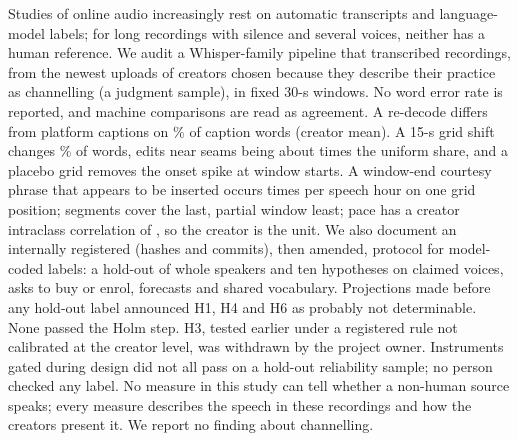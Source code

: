 
Studies of online audio increasingly rest on automatic transcripts and language-model labels; for long recordings with silence and several voices, neither has a human reference. We audit a Whisper-family pipeline that transcribed \NTranscribedRecordings{} recordings, from the newest \NPerCreator{} uploads of \NCreators{} creators chosen because they describe their practice as channelling (a judgment sample), in fixed 30-s windows. No word error rate is reported, and machine comparisons are read as agreement. A re-decode differs from platform captions on \AnchorCaptionMeanPct\% of caption words (creator mean). A 15-s grid shift changes \GsChangedPct\% of words, edits near seams being about \GsNearSeamRatio{} times the uniform share, and a placebo grid removes the onset spike at window starts. A window-end courtesy phrase that appears to be inserted occurs \ThanksPerSpeechHour{} times per speech hour on one grid position; segments cover the last, partial window least; pace has a creator intraclass correlation of \IccPace{}, so the creator is the unit. We also document an internally registered (hashes and commits), then amended, protocol for model-coded labels: a hold-out of whole speakers and ten hypotheses on claimed voices, asks to buy or enrol, forecasts and shared vocabulary. Projections made before any hold-out label announced H1, H4 and H6 as probably not determinable. \ResAbstract{} None passed the Holm step. H3, tested earlier under a registered rule not calibrated at the creator level, was withdrawn by the project owner. Instruments gated during design did not all pass on a hold-out reliability sample; no person checked any label. No measure in this study can tell whether a non-human source speaks; every measure describes the speech in these recordings and how the creators present it. We report no finding about channelling.
